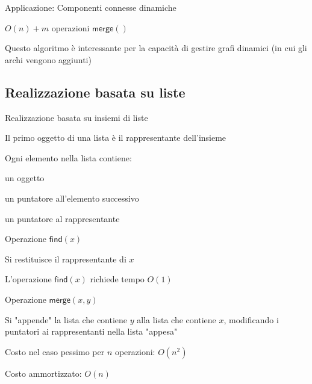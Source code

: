 \begin{frame}{Applicazione: Componenti connesse dinamiche}

\vspace{-9pt}
\begin{myboxtitle}[Complessità]
\smallskip
$O(n) + m$ operazioni $\textsf{merge}()$
\end{myboxtitle}

\begin{myboxtitle}[Motivazione]
\smallskip
Questo algoritmo è interessante per la capacità di gestire grafi dinamici 
(in cui gli archi vengono aggiunti)
\end{myboxtitle}

\end{frame}

\subsection{Realizzazione basata su liste}


\begin{frame}{Realizzazione basata su insiemi di liste}

\vspace{-9pt}
\BIL
\item Il primo oggetto di una lista è il rappresentante dell'insieme
\item Ogni elemento nella lista contiene:
  \BI
  \item un oggetto
  \item un puntatore all'elemento successivo
  \item un puntatore al rappresentante
  \EI
\EIL


\end{frame}

\begin{frame}{Operazione $\textsf{find}(x)$}

\vspace{-9pt}
\BIL
\item Si restituisce il rappresentante di $x$
\item L'operazione $\textsf{find}(x)$ richiede tempo $O(1)$
\EIL

\bigskip
{}

\end{frame}


\begin{frame}{Operazione $\textsf{merge}(x,y)$}

\vspace{-9pt}
\BIL
\item Si "appende" la lista che contiene $y$ alla lista che contiene $x$, modificando
i puntatori ai rappresentanti nella lista "appesa"
\item Costo nel caso pessimo per $n$ operazioni: $O(n^2)$
\item Costo ammortizzato: $O(n)$
\EIL


\end{frame}

